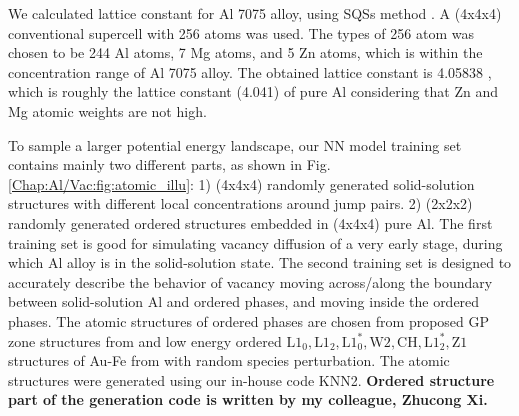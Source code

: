 We calculated lattice constant for Al 7075 alloy, using \acfp{SQS} method \cite{zunger1990special}. A (4x4x4) conventional supercell with 256 atoms was used. The types of 256 atom was chosen to be 244 Al atoms, 7 Mg atoms, and 5 Zn atoms, which is within the concentration range of Al 7075 alloy. The obtained lattice constant is 4.05838 \angstrom, which is roughly the lattice constant (4.041\angstrom) of pure Al considering that Zn and Mg atomic weights are not high. \cite{haas2009calculation}


To sample a larger potential energy landscape, our \ac{NN} model training set contains mainly two different parts, as shown in Fig. \ref{Chap:Al/Vac:fig:atomic_illu}: 1) (4x4x4) randomly generated solid-solution structures with different local concentrations around jump pairs. 2) (2x2x2) randomly generated ordered structures embedded in (4x4x4) pure Al. The first training set is good for simulating vacancy diffusion of a very early stage, during which Al alloy is in the solid-solution state. The second training set is designed to accurately describe the behavior of vacancy moving across/along the boundary between solid-solution Al and ordered phases, and moving inside the ordered phases. The atomic structures of ordered phases are chosen from proposed GP zone structures from \cite{berg2001gp} and low energy ordered $\text{L1}_\text{0}, \text{L1}_\text{2}, \text{L1}_\text{0}^*, \text{W2}, \text{CH}, \text{L1}_\text{2}^*, \text{Z1}$ structures of Au-Fe from \cite{zhuravlev2017phase} with random species perturbation. The atomic  structures were generated using our in-house code KNN2. \cite{Zhang2020KNN2} \textbf{Ordered structure part of the generation code is written by my colleague, Zhucong Xi.}


